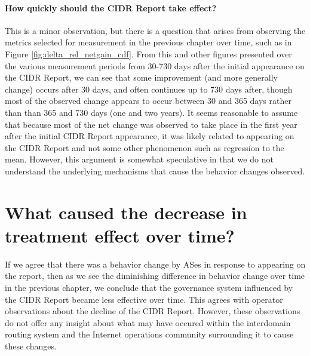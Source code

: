 \paragraph{How quickly should the CIDR Report take effect?}

This is a minor observation, but there is a question that arises from observing
the metrics selected for measurement in the previous chapter over time, such as
in Figure \ref{fig:delta_rel_netgain_cdf}. From this and other figures
presented over the various measurement periods from 30-730 days after the
initial appearance on the CIDR Report, we can see that some improvement (and
more generally change) occurs after 30 days, and often continues up to 730 days
after, though most of the observed change appears to occur between 30 and 365
days rather than than 365 and 730 days (one and two years). It seems reasonable
to assume that because most of the net change was observed to take place in the
first year after the initial CIDR Report appearance, it was likely related to
appearing on the CIDR Report and not some other phenomenon such as regression
to the mean. However, this argument is somewhat speculative in that we do not
understand the underlying mechanisms that cause the behavior changes observed.


\section{What caused the decrease in treatment effect over time?}
If we agree that there was a behavior change by ASes in response to appearing
on the report, then as we see the diminishing difference in behavior change
over time in the previous chapter, we conclude that the governance system
influenced by the CIDR Report became less effective over time. This agrees with
operator observations about the decline of the CIDR Report. However, these
observations do not offer any insight about what may have occured within the
interdomain routing system and the Internet operations community surrounding it
to cause these changes.

